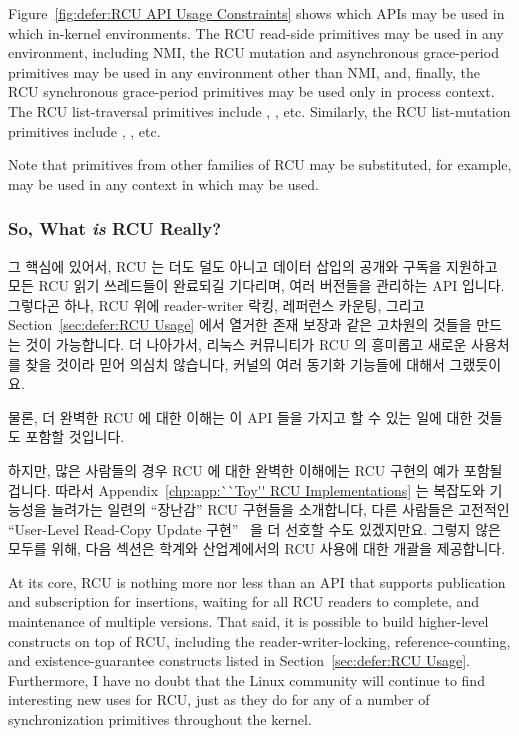Figure~\ref{fig:defer:RCU API Usage Constraints}
shows which APIs may be used in which in-kernel environments.
The RCU read-side primitives may be used in any environment, including NMI,
the RCU mutation and asynchronous grace-period primitives may be used in any
environment other than NMI, and, finally, the RCU synchronous grace-period
primitives may be used only in process context.
The RCU list-traversal primitives include ,
, etc.
Similarly, the RCU list-mutation primitives include
, , etc.

Note that primitives from other families of RCU may be substituted,
for example,  may be used in any context
in which  may be used.
\fi

\subsubsection{So, What \emph{is} RCU Really?}
\label{sec:defer:So, What is RCU Really?}

그 핵심에 있어서, RCU 는 더도 덜도 아니고 데이터 삽입의 공개와 구독을 지원하고
모든 RCU 읽기 쓰레드들이 완료되길 기다리며, 여러 버전들을 관리하는 API 입니다.
그렇다곤 하나, RCU 위에 reader-writer 락킹, 레퍼런스 카운팅, 그리고
Section~\ref{sec:defer:RCU Usage} 에서 열거한 존재 보장과 같은 고차원의 것들을
만드는 것이 가능합니다.
더 나아가서, 리눅스 커뮤니티가 RCU 의 흥미롭고 새로운 사용처를 찾을 것이라 믿어
의심치 않습니다, 커널의 여러 동기화 기능들에 대해서 그랬듯이요.

물론, 더 완벽한 RCU 에 대한 이해는 이 API 들을 가지고 할 수 있는 일에 대한
것들도 포함할 것입니다.

하지만, 많은 사람들의 경우 RCU 에 대한 완벽한 이해에는 RCU 구현의 예가 포함될
겁니다.
따라서 Appendix~\ref{chp:app:``Toy'' RCU Implementations} 는 복잡도와 기능성을
늘려가는 일련의 ``장난감'' RCU 구현들을 소개합니다, 다른 사람들은 고전적인
``User-Level Read-Copy Update 구현''~\cite{MathieuDesnoyers2012URCU} 을 더
선호할 수도 있겠지만요.
그렇지 않은 모두를 위해, 다음 섹션은 학계와 산업계에서의 RCU 사용에 대한 개괄을
제공합니다.
\iffalse

At its core, RCU is nothing more nor less than an API that supports
publication and subscription for insertions, waiting for all RCU readers
to complete, and maintenance of multiple versions.
That said, it is possible to build higher-level constructs
on top of RCU, including the reader-writer-locking, reference-counting,
and existence-guarantee constructs listed in
Section~\ref{sec:defer:RCU Usage}.
Furthermore, I have no doubt that the Linux community will continue to
find interesting new uses for RCU,
just as they do for any of a number of synchronization
primitives throughout the kernel.


